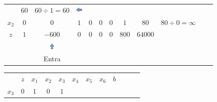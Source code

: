 \begin{frame}
{\begin{table}
\begin{tabular}{c c c c c c c c c c c c}
				& \cellcolor{gray!60}  $ \scriptstyle 60$ 
				& $ \scriptstyle 60 \div 1 = 60$
				& \includegraphics[width=0.3cm,height=0.3cm]{setaesquerda.jpg}\\
				\cellcolor{blue!80} \color{red} $ \scriptstyle x_2$
				& \cellcolor{yellow!60}  $ \scriptstyle 0$
				& \cellcolor{gray!60}  $ \scriptstyle 0$ 
				& \cellcolor{yellow!60}  $ \scriptstyle 1$
				& \cellcolor{yellow!60}  $ \scriptstyle 0$
				& \cellcolor{yellow!60}  $ \scriptstyle 0$
				& \cellcolor{yellow!60}  $ \scriptstyle 0$
				& \cellcolor{yellow!60}  $ \scriptstyle 1$ 
				& \cellcolor{gray!60}  $ \scriptstyle 80$ 
				& $ \scriptstyle 80 \div 0 = \infty $\\
				\cellcolor{blue!80} \color{white} $ \scriptstyle z$
				& \cellcolor{yellow!60}  $ \scriptstyle 1$
				& \cellcolor{gray!60}  $ \scriptstyle -600$ 
				& \cellcolor{yellow!60}  $ \scriptstyle 0$
				& \cellcolor{yellow!60}  $ \scriptstyle 0$
				& \cellcolor{yellow!60}  $ \scriptstyle 0$
				& \cellcolor{yellow!60}  $ \scriptstyle 0$
				& \cellcolor{yellow!60}  $ \scriptstyle 800$ 
				& \cellcolor{gray!60}  $ \scriptstyle 64000$ \\
				& & \includegraphics[width=0.3cm,height=0.3cm]{setacima.jpg} \\
				& & Entra \\
			\end{tabular}
		\end{table}	
	}	
	{
		\begin{table}
			\begin{tabular}{c c c c c c c c c c c c}
				& \cellcolor{blue!80} \color{white} $ \scriptstyle z$
				& \cellcolor{blue!80} \color{white} $ \scriptstyle x_1$ 
				& \cellcolor{blue!80} \color{red} $ \scriptstyle x_2$
				& \cellcolor{blue!80} \color{red} $ \scriptstyle x_3$
				& \cellcolor{blue!80} \color{red} $ \scriptstyle x_4$
				& \cellcolor{blue!80} \color{red} $ \scriptstyle x_5$
				& \cellcolor{blue!80} \color{white} $ \scriptstyle x_6$ 
				& \cellcolor{blue!80} \color{white} $ \scriptstyle b$ \\
				\cellcolor{blue!80} \color{red} $ \scriptstyle x_3$
				& \cellcolor{gray!60}  $ \scriptstyle 0$
				& \cellcolor{red!60}  $ \scriptstyle 1$ 
				& \cellcolor{gray!60}  $ \scriptstyle 0$
				& \cellcolor{gray!60}  $ \scriptstyle 1$

\end{tabular}
\end{table}}
\end{frame}
